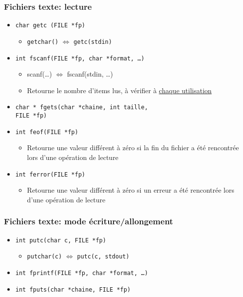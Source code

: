 \documentclass[table,handout,tikz,12pt,svgnames]{beamer}
\begin{document}
\begin{frame}[fragile=singleslide]
	\frametitle{Fichiers texte: lecture}
	\begin{block}{}
		\begin{itemize}

			\item \texttt{char getc (FILE *fp)}
			\begin{itemize}
				\item \texttt{getchar()} $\Leftrightarrow$ \texttt{getc(stdin)}
			\end{itemize}

			\item \texttt{int fscanf(FILE *fp, char *format, \ldots)}
			\begin{itemize}
				\item scanf(\ldots) $\Leftrightarrow$ fscanf(stdin, \ldots)
				\item Retourne le nombre d'items lus, à vérifier à \underline{chaque utilisation}
			\end{itemize}
			
			\item \texttt{char * fgets(char *chaine, int taille,} \\
			\hspace{7em} \texttt{FILE *fp)}
			\item \texttt{int feof(FILE *fp)}
			\begin{itemize}
				\item Retourne une valeur différent à zéro si la fin du fichier a été rencontrée lors d'une opération de lecture
			\end{itemize}
			\item \texttt{int ferror(FILE *fp)}
			\begin{itemize}
				\item Retourne une valeur différent à zéro si un erreur a été rencontrée lors d'une opération de lecture
			\end{itemize}
			
		\end{itemize}
	\end{block}
\end{frame}


\begin{frame}[fragile=singleslide]
	\frametitle{Fichiers texte: mode écriture/allongement}
	\begin{block}{}
		\begin{itemize}
			\item \texttt{int putc(char c, FILE *fp)}
			\begin{itemize}
				\item \texttt{putchar(c)} $\Leftrightarrow$ \texttt{putc(c, stdout)}
			\end{itemize}
			\item \texttt{int fprintf(FILE *fp, char *format, \ldots)}
			\item \texttt{int fputs(char *chaine, FILE *fp)}
		\end{itemize}
	\end{block}
\end{frame}
\end{document}
